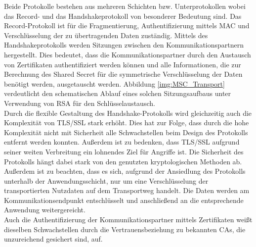 
Beide Protokolle bestehen aus mehreren Schichten bzw. Unterprotokollen wobei das Record- und das Handshakeprotokoll von besonderer Bedeutung sind. 
Das Record-Protokoll ist für die Fragmentierung, Authentifizierung mittels \ac{MAC} und Verschlüsselung der zu übertragenden Daten zuständig. 
Mittels des Handshakeprotokolls werden Sitzungen zwischen den Kommunikationspartnern hergestellt. 
Dies bedeutet, dass die Kommunikationspartner durch den Austausch von Zertifikaten authentifiziert werden können und alle Informationen, die zur Berechnung des Shared Secret für die symmetrische Verschlüsselung der Daten benötigt werden, ausgetauscht werden. 
Abbildung \ref{img:MSC_Transport} verdeutlicht den schematischen Ablauf eines solchen Sitzungsaufbaus unter Verwendung von \ac{RSA} für den Schlüsselaustausch.\\

Durch die flexible Gestaltung des Handshake-Protokolls wird gleichzeitig auch die Komplexität von \ac{TLS/SSL} stark erhöht. 
Dies hat zur Folge, dass durch die hohe Komplexität nicht mit Sicherheit alle Schwachstellen beim Design des Protokolls entfernt werden konnten. 
Außerdem ist zu bedenken, dass \ac{TLS/SSL} aufgrund seiner weiten Verbreitung ein lohnendes Ziel für Angriffe ist. Die Sicherheit des Protokolls hängt dabei stark von den genutzten kryptologischen Methoden ab. 
Außerdem ist zu beachten, dass es sich, aufgrund der Ansiedlung des Protokolls unterhalb der Anwendungsschicht, nur um eine Verschlüsselung der transportierten Nutzdaten auf dem Transportweg handelt. 
Die Daten werden am Kommunikationsendpunkt entschlüsselt und anschließend an die entsprechende Anwendung weitergereicht.\\

Auch die Authentifizierung der Kommunikationspartner mittels Zertifikaten weißt dieselben Schwachstellen durch die Vertrauensbeziehung zu bekannten \acp{CA}, die unzureichend gesichert sind, auf.  